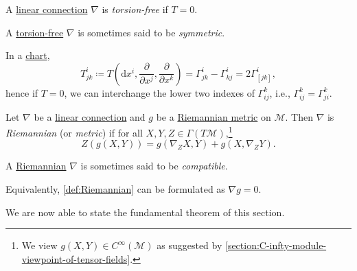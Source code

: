 \begin{definition}\label{def:torsion-free}
	A \hyperref[def:linear-connection]{linear connection} \(\nabla \) is \emph{torsion-free} if \(T = 0\).
\end{definition}

\begin{notation}[symmetric]
	A \hyperref[def:torsion-free]{torsion-free} \(\nabla \) is sometimes said to be \emph{symmetric}.
\end{notation}

In a \hyperref[def:coordinate-chart]{chart},
\[
	T^i_{jk} \coloneqq T\left( \mathrm{d} x^i, \frac{\partial }{\partial x^j} , \frac{\partial }{\partial x^k} \right) = \Gamma ^i_{jk} - \Gamma ^i_{kj} = 2\Gamma ^i_{[jk]},
\]
hence if \(T = 0\), we can interchange the lower two indexes of \(\Gamma ^k _{ij}\), i.e., \(\Gamma ^k _{ij} = \Gamma ^k _{ji}\).

\begin{definition}[Riemannian]\label{def:Riemannian}
	Let \(\nabla \) be a \hyperref[def:linear-connection]{linear connection} and \(g\) be a \hyperref[def:Riemannian-metric]{Riemannian metric} on \(\mathcal{M} \). Then \(\nabla \) is \emph{Riemannian} (or \emph{metric}) if for all \(X, Y, Z\in \Gamma (T\mathcal{M} )\),\footnote{We view \(g(X, Y)\in C^{\infty} (\mathcal{M} )\) as suggested by \autoref{section:C-infty-module-viewpoint-of-tensor-fields}.}
	\[
		Z(g(X, Y)) = g(\nabla _{Z} X, Y) + g(X, \nabla _{Z} Y).
	\]
\end{definition}

\begin{notation}[Compatible]
	A \hyperref[def:Riemannian]{Riemannian} \(\nabla \) is sometimes said to be \emph{compatible}.
\end{notation}

\begin{remark}
	Equivalently, \autoref{def:Riemannian} can be formulated as \(\nabla g = 0\).
\end{remark}

We are now able to state the fundamental theorem of this section.

